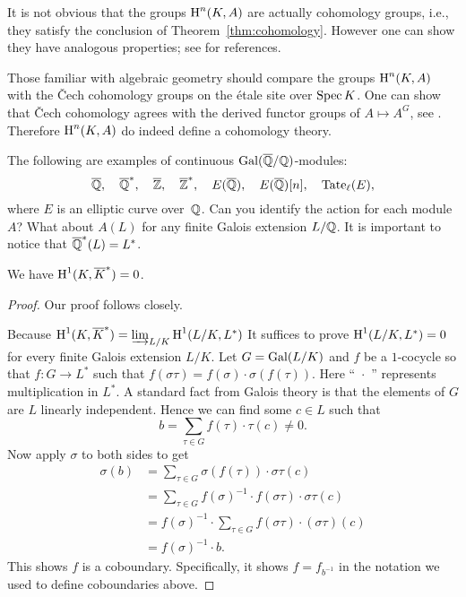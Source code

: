 It is not obvious that the groups $\operatorname{H}^n(K,A)$ are
actually cohomology groups, i.e., they satisfy the
conclusion of Theorem~\ref{thm:cohomology}. However
one can show they have analogous properties; see
\cite[Ch.~X.3]{serre:localfields} for references.

\begin{remark}
	Those familiar with algebraic geometry should
	compare the groups $\operatorname{H}^n(K,A)$ with the \v{C}ech
	cohomology groups on the \'{e}tale site over $\operatorname{Spec} K$.
	One can show that \v{C}ech cohomology
	agrees with the derived functor groups of
	$A\mapsto A^G$, see \cite[Ch.~10]{milne:etale}.
	Therefore $\operatorname{H}^n(K,A)$ do indeed define a cohomology
	theory.
\end{remark}

\begin{example}
The following are examples of continuous $\operatorname{Gal}(\overline{\mathbb{Q}}/\mathbb{Q})$-modules:
$$
	\overline{\mathbb{Q}},
	\quad \overline{\mathbb{Q}}^*,
	\quad \overline{\mathbb{Z}},
	\quad \overline{\mathbb{Z}}^*,
	\quad E(\overline{\mathbb{Q}}),
	\quad E(\overline{\mathbb{Q}})[n],
	\quad {\rm Tate}_{\ell}(E),
$$
where $E$ is an elliptic curve over~$\mathbb{Q}$. Can you identify the
action for each module $A$? What about $A(L)$ for any finite
Galois extension $L/\mathbb{Q}$. It is important to notice that
$\overline{\mathbb{Q}}^*(L) = L^*$.
\end{example}

\begin{theorem}[Hilbert 90]\label{thm:h90}
	We have $\operatorname{H}^1(K,\overline{K}^*) = 0$.
\end{theorem}
\begin{proof}
	Our proof follows \cite[pg.~150]{serre:localfields} closely.

	Because $\operatorname{H}^1(K,\overline{K}^*) = \varinjlim_{L/K} \operatorname{H}^1(L/K,L^*)$
	It suffices to prove $\operatorname{H}^1(L/K,L^*) = 0$ for every finite
	Galois extension $L/K$.
	Let $G = \operatorname{Gal}(L/K)$ and $f$ be a $1$-cocycle so that $f:G \to L^*$
	such that $f(\sigma\tau) = f(\sigma)\cdot\sigma(f(\tau))$. Here
	``~$\cdot$~'' represents multiplication in $L^*$.
	A standard fact from Galois theory is that the elements of
	$G$ are $L$ linearly independent. Hence we can find
	some $c\in L$ such that
	$$
	b = \sum_{\tau\in G} f(\tau)\cdot\tau(c) \neq 0.
	$$
	Now apply $\sigma$ to both sides to get
	\begin{align*}
		\sigma(b)
		&=
		\sum_{\tau\in G} \sigma(f(\tau)) \cdot \sigma\tau(c)
		\\
		&=
		\sum_{\tau\in G} f(\sigma)^{-1} \cdot f(\sigma\tau)
		\cdot \sigma\tau(c)
		\\
		&=
		f(\sigma)^{-1} \cdot \sum_{\tau\in G} f(\sigma\tau)
		\cdot (\sigma\tau)(c)
		\\
		&=
		f(\sigma)^{-1}\cdot b.
	\end{align*}
	This shows $f$ is a coboundary. Specifically, it shows
	$f = f_{b^{-1}}$ in the notation we used to define
	coboundaries above.
\end{proof}

